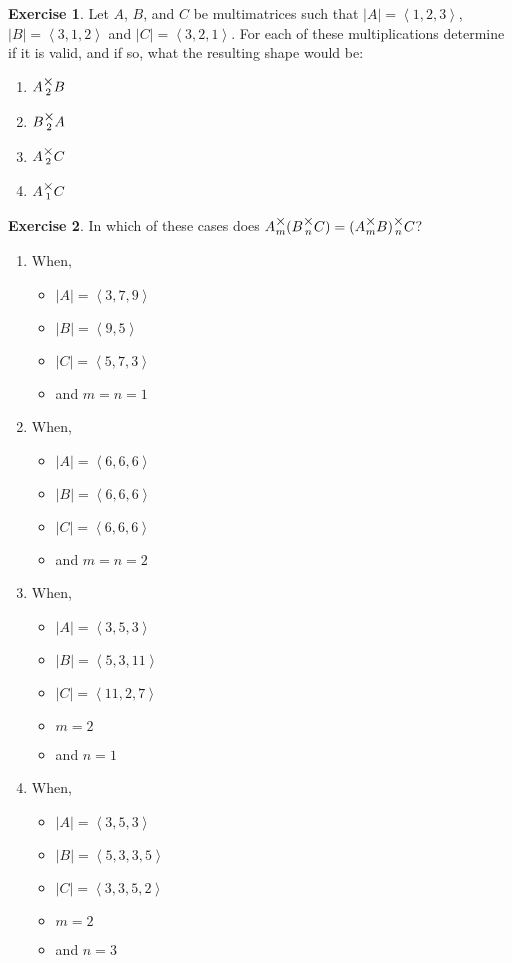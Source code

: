 \documentclass[12pt]{book}
\theoremstyle{plain}
\theoremstyle{definition}
\newtheorem{exercise}{Exercise}[chapter]
\theoremstyle{ppart}
\theoremstyle{case}
\theoremstyle{solution}
\newcommand{\mmult}[1]{\text{\raisebox{1ex}{$\underset{#1}{\times}$}}}
\newcommand{\shape}[1]{\left|#1\right|}
\begin{document}
\begin{exercise}
Let $A$, $B$, and $C$ be multimatrices such that $\shape{A} = \left<1,2,3\right>$,
$\shape{B} = \left<3,1,2\right>$ and $\shape{C} = \left<3,2,1\right>$. For each of these
multiplications determine if it is valid, and if so, what the resulting
shape would be:
\begin{enumerate}
\item $A \mmult{2} B$
\item $B \mmult{2} A$
\item $A \mmult{2} C$
\item $A \mmult{1} C$
\end{enumerate}
\end{exercise}

\begin{exercise}
In which of these cases does $A \mmult{m} (B \mmult{n} C) = (A \mmult{m} B) \mmult{n} C$?
\begin{enumerate}
\item When,
	\begin{itemize}
		\item $\shape{A} = \left<3, 7, 9\right>$
		\item $\shape{B} = \left<9, 5\right>$
		\item $\shape{C} = \left<5, 7, 3\right>$
		\item and $m = n = 1$
	\end{itemize}
\item When,
	\begin{itemize}
		\item $\shape{A} = \left<6, 6, 6\right>$
		\item $\shape{B} = \left<6, 6, 6\right>$
		\item $\shape{C} = \left<6, 6, 6\right>$
		\item and $m = n = 2$
	\end{itemize}
\item When,
	\begin{itemize}
		\item $\shape{A} = \left<3, 5, 3\right>$
		\item $\shape{B} = \left<5, 3, 11\right>$
		\item $\shape{C} = \left<11, 2, 7\right>$
		\item $m = 2$
		\item and $n = 1$
	\end{itemize}
\item When,
	\begin{itemize}
		\item $\shape{A} = \left<3, 5, 3\right>$
		\item $\shape{B} = \left<5, 3, 3, 5\right>$
		\item $\shape{C} = \left<3, 3, 5, 2\right>$
		\item $m = 2$
		\item and $n = 3$
	\end{itemize}
\end{enumerate}
\end{exercise}
\end{document}
